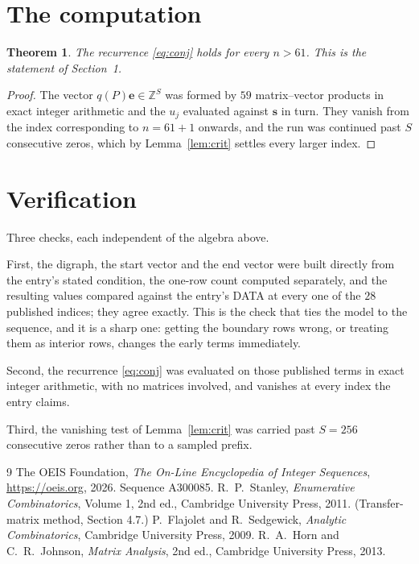 \documentclass[11pt,a4paper]{article}
\theoremstyle{plain}
\newtheorem{theorem}{Theorem}
\theoremstyle{definition}
\begin{document}
\section{The computation}

\begin{theorem}
The recurrence \eqref{eq:conj} holds for every $n>61$. This is the statement of
Section~1.
\end{theorem}

\begin{proof}
The vector $q(P)\mathbf{e}\in\mathbb{Z}^{S}$ was formed by $59$ matrix--vector
products in exact integer arithmetic and the $u_j$ evaluated against $\mathbf{s}$ in turn.
They vanish from the index corresponding to $n=61+1$ onwards, and the run was continued
past $S$ consecutive zeros, which by Lemma~\ref{lem:crit} settles every larger index.
\end{proof}

\section{Verification}

Three checks, each independent of the algebra above.

First, the digraph, the start vector and the end vector were built directly from the
entry's stated condition, the one-row count computed separately, and the resulting values
compared against the entry's DATA at every one of the $28$ published indices; they
agree exactly. This is the check that ties the model to the sequence, and it is a sharp one:
getting the boundary rows wrong, or treating them as interior rows, changes the early terms
immediately.

Second, the recurrence \eqref{eq:conj} was evaluated on those published terms in exact
integer arithmetic, with no matrices involved, and vanishes at every index the entry claims.

Third, the vanishing test of Lemma~\ref{lem:crit} was carried past $S=256$ consecutive
zeros rather than to a sampled prefix.

\begin{thebibliography}{9}
 The OEIS Foundation, \emph{The On-Line Encyclopedia of Integer
Sequences}, \url{https://oeis.org}, 2026. Sequence A300085.
 R.~P.~Stanley, \emph{Enumerative Combinatorics}, Volume 1, 2nd ed.,
Cambridge University Press, 2011. (Transfer-matrix method, Section 4.7.)
 P.~Flajolet and R.~Sedgewick, \emph{Analytic Combinatorics}, Cambridge
University Press, 2009.
 R.~A.~Horn and C.~R.~Johnson, \emph{Matrix Analysis}, 2nd ed., Cambridge
University Press, 2013.
\end{thebibliography}
\end{document}
